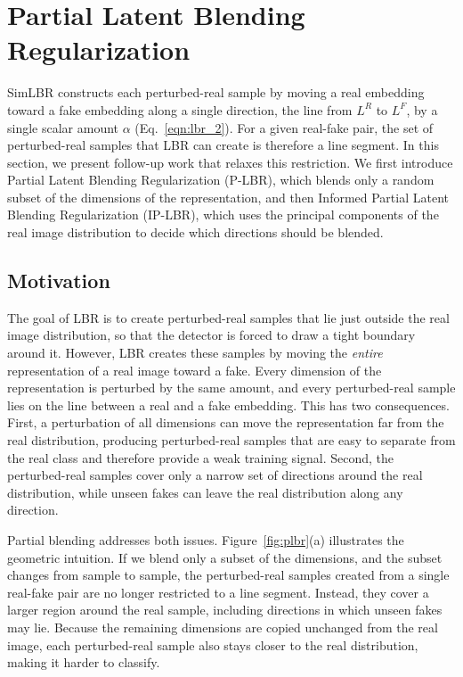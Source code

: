 \section{Partial Latent Blending Regularization}
\label{sec:plbr}
SimLBR constructs each perturbed-real sample by moving a real embedding toward a fake embedding along a single direction, the line from $L^R$ to $L^F$, by a single scalar amount $\alpha$ (Eq.~\ref{eqn:lbr_2}). For a given real-fake pair, the set of perturbed-real samples that LBR can create is therefore a line segment. In this section, we present follow-up work that relaxes this restriction. We first introduce Partial Latent Blending Regularization (P-LBR), which blends only a random subset of the dimensions of the representation, and then Informed Partial Latent Blending Regularization (IP-LBR), which uses the principal components of the real image distribution to decide which directions should be blended. 

\subsection{Motivation}
The goal of LBR is to create perturbed-real samples that lie just outside the real image distribution, so that the detector is forced to draw a tight boundary around it. However, LBR creates these samples by moving the \textit{entire} representation of a real image toward a fake. Every dimension of the representation is perturbed by the same amount, and every perturbed-real sample lies on the line between a real and a fake embedding. This has two consequences. First, a perturbation of all dimensions can move the representation far from the real distribution, producing perturbed-real samples that are easy to separate from the real class and therefore provide a weak training signal. Second, the perturbed-real samples cover only a narrow set of directions around the real distribution, while unseen fakes can leave the real distribution along any direction.

Partial blending addresses both issues. Figure~\ref{fig:plbr}(a) illustrates the geometric intuition. If we blend only a subset of the dimensions, and the subset changes from sample to sample, the perturbed-real samples created from a single real-fake pair are no longer restricted to a line segment. Instead, they cover a larger region around the real sample, including directions in which unseen fakes may lie. Because the remaining dimensions are copied unchanged from the real image, each perturbed-real sample also stays closer to the real distribution, making it harder to classify.

